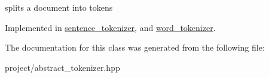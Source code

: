 splits a document into tokens 

Implemented in \hyperlink{classsentence__tokenizer_a7d8d0af4624c8bc7d37dd85af99f5695}{sentence\+\_\+tokenizer}, and \hyperlink{classword__tokenizer_ab0308f2cf9249f3c296307a055ee78df}{word\+\_\+tokenizer}.



The documentation for this class was generated from the following file\+:\begin{DoxyCompactItemize}
\item 
project/abstract\+\_\+tokenizer.\+hpp\end{DoxyCompactItemize}
